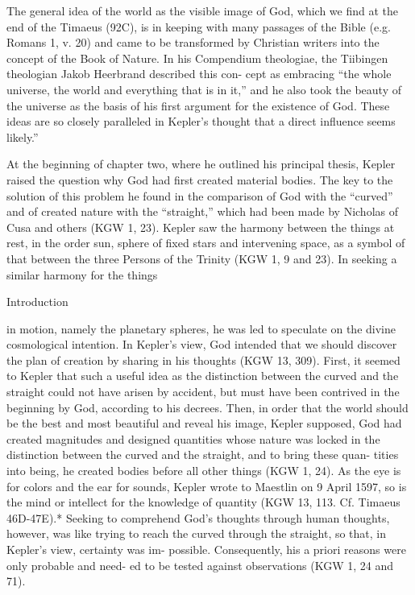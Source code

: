 \documentclass{article}
\begin{document}
The general idea of the world as the visible image of God, which we find
at the end of the Timaeus (92C), is in keeping with many passages of the
Bible (e.g. Romans 1, v. 20) and came to be transformed by Christian
writers into the concept of the Book of Nature. In his Compendium
theologiae, the Tiibingen theologian Jakob Heerbrand described this con-
cept as embracing “the whole universe, the world and everything that is in
it,” and he also took the beauty of the universe as the basis of his first
argument for the existence of God. These ideas are so closely paralleled in
Kepler’s thought that a direct influence seems likely.”

At the beginning of chapter two, where he outlined his principal thesis,
Kepler raised the question why God had first created material bodies. The
key to the solution of this problem he found in the comparison of God
with the “curved” and of created nature with the “straight,” which had
been made by Nicholas of Cusa and others (KGW 1, 23). Kepler saw the
harmony between the things at rest, in the order sun, sphere of fixed stars
and intervening space, as a symbol of that between the three Persons of
the Trinity (KGW 1, 9 and 23). In seeking a similar harmony for the things

Introduction

in motion, namely the planetary spheres, he was led to speculate on the
divine cosmological intention. In Kepler’s view, God intended that we
should discover the plan of creation by sharing in his thoughts (KGW 13,
309). First, it seemed to Kepler that such a useful idea as the distinction
between the curved and the straight could not have arisen by accident, but
must have been contrived in the beginning by God, according to his
decrees. Then, in order that the world should be the best and most
beautiful and reveal his image, Kepler supposed, God had created
magnitudes and designed quantities whose nature was locked in the
distinction between the curved and the straight, and to bring these quan-
tities into being, he created bodies before all other things (KGW 1, 24). As
the eye is for colors and the ear for sounds, Kepler wrote to Maestlin on 9
April 1597, so is the mind or intellect for the knowledge of quantity
(KGW 13, 113. Cf. Timaeus 46D-47E).* Seeking to comprehend God’s
thoughts through human thoughts, however, was like trying to reach the
curved through the straight, so that, in Kepler’s view, certainty was im-
possible. Consequently, his a priori reasons were only probable and need-
ed to be tested against observations (KGW 1, 24 and 71).
\end{document}
